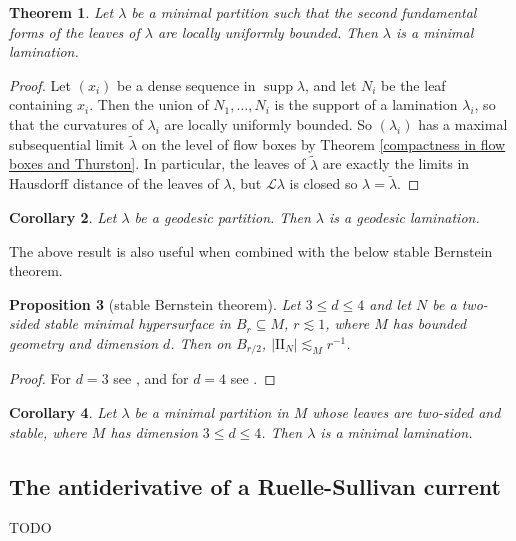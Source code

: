 \documentclass[reqno,11pt]{amsart}
\DeclareMathOperator{\supp}{supp}
\newcommand{\Leaves}{\mathscr L}
\newcommand{\Two}{\mathrm{I\!I}}
\newtheorem{theorem}{Theorem}[section]
\newtheorem{proposition}[theorem]{Proposition}
\newtheorem{corollary}[theorem]{Corollary}
\theoremstyle{definition}
\numberwithin{equation}{section}
\begin{document}
\begin{theorem}\label{partition implies lamination}
Let $\lambda$ be a minimal partition such that the second fundamental forms of the leaves of $\lambda$ are locally uniformly bounded.
Then $\lambda$ is a minimal lamination.
\end{theorem}
\begin{proof}
Let $(x_i)$ be a dense sequence in $\supp \lambda$, and let $N_i$ be the leaf containing $x_i$.
Then the union of $N_1, \dots, N_i$ is the support of a lamination $\lambda_i$, so that the curvatures of $\lambda_i$ are locally uniformly bounded.
So $(\lambda_i)$ has a maximal subsequential limit $\tilde \lambda$ on the level of flow boxes by Theorem \ref{compactness in flow boxes and Thurston}.
In particular, the leaves of $\tilde \lambda$ are exactly the limits in Hausdorff distance of the leaves of $\lambda$, but $\Leaves \lambda$ is closed so $\lambda = \tilde \lambda$.
\end{proof}

\begin{corollary}
Let $\lambda$ be a geodesic partition. Then $\lambda$ is a geodesic lamination.
\end{corollary}

The above result is also useful when combined with the below stable Bernstein theorem.

\begin{proposition}[stable Bernstein theorem]
Let $3 \leq d \leq 4$ and let $N$ be a two-sided stable minimal hypersurface in $B_r \subseteq M$, $r \lesssim 1$, where $M$ has bounded geometry and dimension $d$.
Then on $B_{r/2}$, $|\Two_N| \lesssim_M r^{-1}$.
\end{proposition}
\begin{proof}
For $d = 3$ see \cite[Corollary 2.11]{colding2011course}, and for $d = 4$ see \cite{Chodosh2021}.
\end{proof}

\begin{corollary}
Let $\lambda$ be a minimal partition in $M$ whose leaves are two-sided and stable, where $M$ has dimension $3 \leq d \leq 4$.
Then $\lambda$ is a minimal lamination.
\end{corollary}

\subsection{The antiderivative of a Ruelle-Sullivan current}
TODO

\printbibliography
\end{document}
